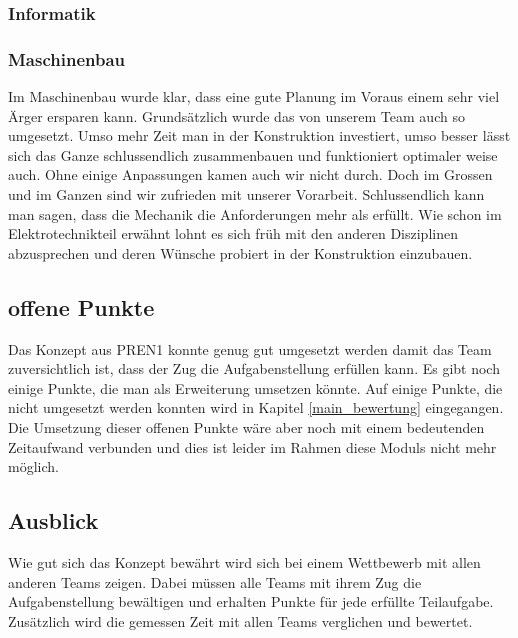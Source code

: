 \documentclass[../../main.tex]{subfiles}
\begin{document}
\subsubsection{Informatik}

\subsubsection{Maschinenbau}
Im Maschinenbau wurde klar, dass eine gute Planung im Voraus einem sehr viel Ärger ersparen kann. Grundsätzlich wurde das von unserem Team auch so umgesetzt. Umso mehr Zeit man in der Konstruktion investiert, umso besser lässt sich das Ganze schlussendlich zusammenbauen und funktioniert optimaler weise auch. Ohne einige Anpassungen kamen auch wir nicht durch. Doch im Grossen und im Ganzen sind wir zufrieden mit unserer Vorarbeit. Schlussendlich kann man sagen, dass die Mechanik die Anforderungen mehr als erfüllt.
Wie schon im Elektrotechnikteil erwähnt lohnt es sich früh mit den anderen Disziplinen abzusprechen und deren Wünsche probiert in der Konstruktion einzubauen.



\subsection{offene Punkte}
Das Konzept aus PREN1 konnte genug gut umgesetzt werden damit das Team zuversichtlich ist, dass der Zug die Aufgabenstellung erfüllen kann. Es gibt noch einige Punkte, die man als Erweiterung umsetzen könnte. Auf einige Punkte, die nicht umgesetzt werden konnten wird in Kapitel \ref{main_bewertung} eingegangen. Die Umsetzung dieser offenen Punkte wäre aber noch mit einem bedeutenden Zeitaufwand verbunden und dies ist leider im Rahmen diese Moduls nicht mehr möglich.

\subsection{Ausblick}
Wie gut sich das Konzept bewährt wird sich bei einem Wettbewerb mit allen anderen Teams zeigen. Dabei müssen alle Teams mit ihrem Zug die Aufgabenstellung bewältigen und erhalten Punkte für jede erfüllte Teilaufgabe. Zusätzlich wird die gemessen Zeit mit allen Teams verglichen und bewertet.
\end{document}
